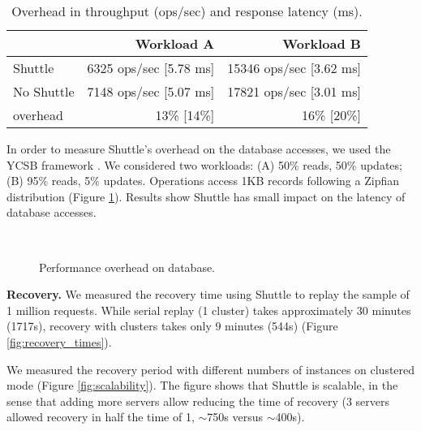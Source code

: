 \begin{table}
\footnotesize
\begin{tabular}{l|rr}
                       &  Workload A                    & Workload B  \\ \hline
Shuttle                &  6325 ops/sec [5.78 ms]        &  15346 ops/sec [3.62 ms]  \\
No Shuttle             &  7148 ops/sec [5.07 ms]        &  17821 ops/sec [3.01 ms]  \\
overhead               &  13\% [14\%]                    & 16\% [20\%] \\
\end{tabular}
\caption{Overhead in throughput (ops/sec) and response latency (ms).}
\label{tab:throughput}
\end{table}

In order to measure Shuttle's overhead on the database accesses, we used the \acf{YCSB} framework \cite{ycsb}. We considered two workloads: (A)  50\% reads, 50\% updates; (B)  95\% reads, 5\% updates. Operations access 1KB records following a Zipfian distribution (Figure \ref{fig:database_overhead}). Results show Shuttle has small impact on the latency of database accesses. 

\begin{figure}[tbh]
\vspace{-6mm}
\hspace*{-0.5cm}
  \LARGE
  \mbox{
  }
  \caption{Performance overhead on database.}
  \vspace{-2mm}
  \label{fig:database_overhead}
\end{figure}


\textbf{Recovery.}
We measured the recovery time using Shuttle to replay the sample of 1 million requests. While serial replay (1 cluster) takes approximately 30 minutes (1717s), recovery with clusters takes only 9 minutes (544s) (Figure \ref{fig:recovery_times}).

We measured the recovery period with different numbers of instances on clustered mode (Figure \ref{fig:scalability}). The figure shows that Shuttle is scalable, in the sense that adding more servers allow reducing the time of recovery (3 servers allowed recovery in half the time of 1, $\sim$750s versus $\sim$400s). 


